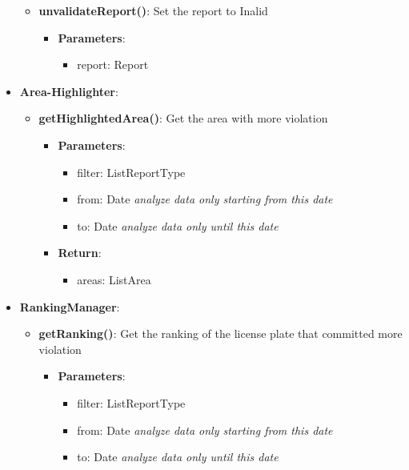 \documentclass{article}
\begin{document}
\begin{itemize}
\begin{itemize}
\begin{itemize}
				\end{itemize}
			\item \textbf{unvalidateReport()}:
				Set the report to Inalid
				\begin{itemize}
					\item \textbf{Parameters}:
						\begin{itemize}
							\item report: Report
						\end{itemize}
				\end{itemize}
		\end{itemize}
	\item \textbf{Area-Highlighter}: 
		\begin{itemize}
			\item \textbf{getHighlightedArea()}:
				Get the area with more violation
				\begin{itemize}
					\item \textbf{Parameters}:
						\begin{itemize}
							\item filter: List\textlangle{}ReportType\textrangle{}
							\item from: Date \textit{analyze data only starting from this date}
							\item to: Date \textit{analyze data only until this date}
						\end{itemize}
					\item \textbf{Return}:
						\begin{itemize}
							\item areas: List\textlangle{}Area\textrangle{}
						\end{itemize}
				\end{itemize} 
		\end{itemize}
	\item \textbf{RankingManager}: 
		\begin{itemize}
			\item \textbf{getRanking()}:
			Get the ranking of the license plate that committed more violation
				\begin{itemize}
					\item \textbf{Parameters}:
						\begin{itemize}
							\item filter: List\textlangle{}ReportType\textrangle{}
							\item from: Date \textit{analyze data only starting from this date}
							\item to: Date \textit{analyze data only until this date}

\end{itemize}
\end{itemize}
\end{itemize}
\end{itemize}
\end{document}

